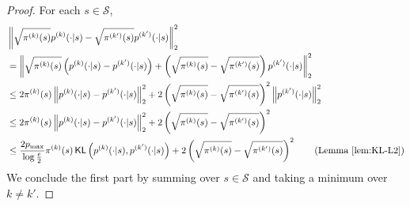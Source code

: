 \documentclass[twoside]{article}
\DeclareMathOperator{\KL}{{\mathsf{KL}}}
\def\gS{{\mathcal{S}}}
\theoremstyle{plain}
\def\bignorm#1{\left\lVert #1 \right\rVert}
\begin{document}
\begin{proof}
    For each $s \in \gS$,
    \begin{align*}
        &\bignorm{\sqrt{\pi^{(k)}(s)} p^{(k)}(\cdot | s) - \sqrt{\pi^{(k')}(s)} p^{(k')}(\cdot | s)}_2^2 \\
        &= \bignorm{\sqrt{\pi^{(k)}(s)} \left( p^{(k)}(\cdot | s) - p^{(k')}(\cdot | s) \right) + \left(\sqrt{\pi^{(k)}(s)} - \sqrt{\pi^{(k')}(s)}\right) p^{(k')}(\cdot | s)}_2^2 \\
        &\leq 2 \pi^{(k)}(s) \bignorm{p^{(k)}(\cdot | s) - p^{(k')}(\cdot | s)}_2^2 + 2 \left( \sqrt{\pi^{(k)}(s)} - \sqrt{\pi^{(k')}(s)} \right)^2 \bignorm{p^{(k')}(\cdot | s)}_2^2 \\
        &\leq 2 \pi^{(k)}(s) \bignorm{p^{(k)}(\cdot | s) - p^{(k')}(\cdot | s)}_2^2 + 2 \left( \sqrt{\pi^{(k)}(s)} - \sqrt{\pi^{(k')}(s)} \right)^2 \\
        &\leq \frac{2 p_{\max}}{\log\frac{e}{2}} \pi^{(k)}(s) \KL\left( p^{(k)}(\cdot | s), p^{(k')}(\cdot | s) \right) + 2 \left( \sqrt{\pi^{(k)}(s)} - \sqrt{\pi^{(k')}(s)} \right)^2\tag{Lemma~\ref{lem:KL-L2}}
    \end{align*}
    We conclude the first part by summing over $s \in \gS$ and taking a minimum over $k \neq k'$.


\end{proof}
\end{document}
